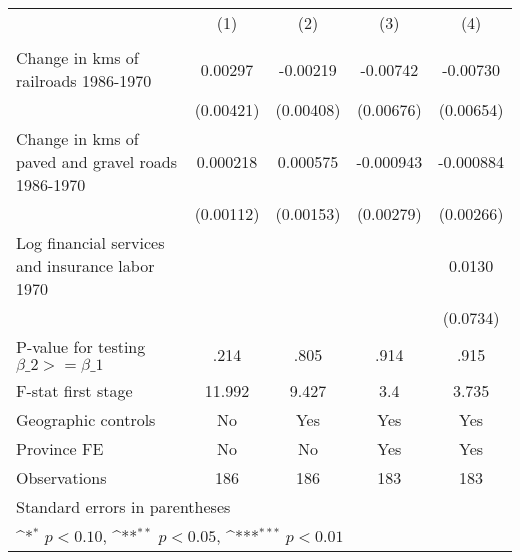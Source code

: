 {
\def\sym#1{\ifmmode^{#1}\else\(^{#1}\)\fi}
\begin{tabular}{l*{4}{c}}
\hline\hline
                &\multicolumn{1}{c}{(1)}&\multicolumn{1}{c}{(2)}&\multicolumn{1}{c}{(3)}&\multicolumn{1}{c}{(4)}\\
                &\multicolumn{1}{c}{}&\multicolumn{1}{c}{}&\multicolumn{1}{c}{}&\multicolumn{1}{c}{}\\
\hline
Change in kms of railroads 1986-1970&  0.00297         & -0.00219         & -0.00742         & -0.00730         \\
                &(0.00421)         &(0.00408)         &(0.00676)         &(0.00654)         \\
[1em]
Change in kms of paved and gravel roads 1986-1970& 0.000218         & 0.000575         &-0.000943         &-0.000884         \\
                &(0.00112)         &(0.00153)         &(0.00279)         &(0.00266)         \\
[1em]
Log financial services and insurance labor 1970&                  &                  &                  &   0.0130         \\
                &                  &                  &                  & (0.0734)         \\
\hline
P-value for testing $\beta\_{2} >= \beta\_{1}$&     .214         &     .805         &     .914         &     .915         \\
F-stat first stage&   11.992         &    9.427         &      3.4         &    3.735         \\
Geographic controls&       No         &      Yes         &      Yes         &      Yes         \\
Province FE     &       No         &       No         &      Yes         &      Yes         \\
Observations    &      186         &      186         &      183         &      183         \\
\hline\hline
\multicolumn{5}{l}{\footnotesize Standard errors in parentheses}\\
\multicolumn{5}{l}{\footnotesize \sym{*} \(p<0.10\), \sym{**} \(p<0.05\), \sym{***} \(p<0.01\)}\\
\end{tabular}
}
